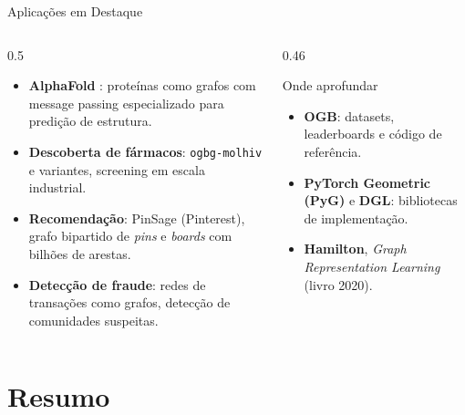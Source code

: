 \documentclass[aspectratio=169,xcolor=dvipsnames]{beamer}
\begin{document}
  \begin{frame}{Aplicações em Destaque}
    \begin{columns}[T]
      \begin{column}{0.5\textwidth}
        \begin{itemize}
          \item \textbf{AlphaFold} :
                proteínas como grafos com message passing especializado
                para predição de estrutura.
          \item \textbf{Descoberta de fármacos}: \texttt{ogbg-molhiv} e variantes,
                screening em escala industrial.
          \item \textbf{Recomendação}: PinSage (Pinterest), grafo bipartido
                de \textit{pins} e \textit{boards} com bilhões de arestas.
          \item \textbf{Detecção de fraude}: redes de transações como grafos,
                detecção de comunidades suspeitas.
        \end{itemize}
      \end{column}
      \begin{column}{0.46\textwidth}
        \begin{block}{Onde aprofundar}
          \begin{itemize}
            \item \textbf{OGB}: datasets, leaderboards e código de referência.
            \item \textbf{PyTorch Geometric (PyG)} e \textbf{DGL}: bibliotecas
                  de implementação.
            \item \textbf{Hamilton}, \emph{Graph Representation Learning}
                  (livro 2020).
          \end{itemize}
        \end{block}
      \end{column}
    \end{columns}
  \end{frame}

  \section*{Resumo}
\end{document}
